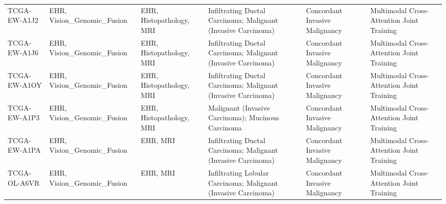 \begin{table}
\begin{tabular}{llllll}
TCGA-EW-A1J2 & EHR, Vision\_Genomic\_Fusion & EHR, Histopathology, MRI & Infiltrating Ductal Carcinoma; Malignant (Invasive Carcinoma) & Concordant Invasive Malignancy & Multimodal Cross-Attention Joint Training \\
TCGA-EW-A1J6 & EHR, Vision\_Genomic\_Fusion & EHR, Histopathology, MRI & Infiltrating Ductal Carcinoma; Malignant (Invasive Carcinoma) & Concordant Invasive Malignancy & Multimodal Cross-Attention Joint Training \\
TCGA-EW-A1OY & EHR, Vision\_Genomic\_Fusion & EHR, Histopathology, MRI & Infiltrating Ductal Carcinoma; Malignant (Invasive Carcinoma) & Concordant Invasive Malignancy & Multimodal Cross-Attention Joint Training \\
TCGA-EW-A1P3 & EHR, Vision\_Genomic\_Fusion & EHR, Histopathology, MRI & Malignant (Invasive Carcinoma); Mucinous Carcinoma & Concordant Invasive Malignancy & Multimodal Cross-Attention Joint Training \\
TCGA-EW-A1PA & EHR, Vision\_Genomic\_Fusion & EHR, MRI & Infiltrating Ductal Carcinoma; Malignant (Invasive Carcinoma) & Concordant Invasive Malignancy & Multimodal Cross-Attention Joint Training \\
TCGA-OL-A6VR & EHR, Vision\_Genomic\_Fusion & EHR, MRI & Infiltrating Lobular Carcinoma; Malignant (Invasive Carcinoma) & Concordant Invasive Malignancy & Multimodal Cross-Attention Joint Training \\
\bottomrule
\end{tabular}
\end{table}
